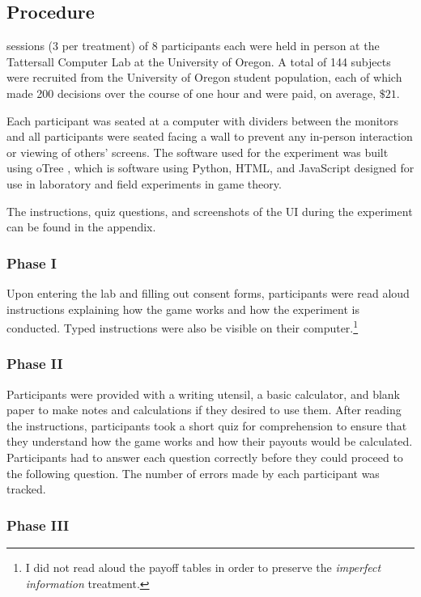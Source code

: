 \subsection{Procedure}
 sessions (3 per treatment) of 8 participants each were held in person at the Tattersall Computer Lab at the University of Oregon. A total of 144 subjects were recruited from the University of Oregon student population, each of which made 200 decisions over the course of one hour and were paid, on average, $\$21$. 

Each participant was seated at a computer with dividers between the monitors and all participants were seated facing a wall to prevent any in-person interaction or viewing of others' screens. The software used for the experiment was built using oTree \citep{chen2016otree}, which is software using Python, HTML, and JavaScript designed for use in laboratory and field experiments in game theory.

The instructions, quiz questions, and screenshots of the UI during the experiment can be found in the appendix.


\subsubsection*{Phase I}
Upon entering the lab and filling out consent forms, participants were read aloud instructions explaining how the game works and how the experiment is conducted. Typed instructions were also be visible on their computer.\footnote{I did not read aloud the payoff tables in order to preserve the \textit{imperfect information} treatment.}

\subsubsection*{Phase II}
Participants were provided with a writing utensil, a basic calculator, and blank paper to make notes and calculations if they desired to use them. After reading the instructions, participants took a short quiz for comprehension to ensure that they understand how the game works and how their payouts would be calculated.
Participants had to answer each question correctly before they could proceed to the following question. The number of errors made by each participant was tracked.

\subsubsection*{Phase III}

